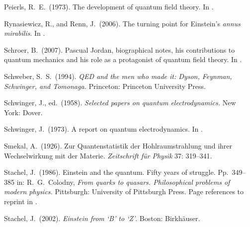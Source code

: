 \documentclass{elsart}
\begin{document}
{\begin{thebibliography}{}
 Peierls, R.\ E.\ (1973). The development of quantum field theory. In \citep[pp.\ 370--379]{Mehra 1973}.


 Rynasiewicz, R., and Renn, J.\ (2006). The turning point for Einstein's {\it annus mirabilis}. In \citep[5--35]{Janssen 2006}.

 Schroer, B.\ (2007). Pascual Jordan, biographical notes, his contributions to quantum mechanics and his role as a protagonist of quantum field theory. In \citep[pp.\ 47--68]{Hoffmann 2007}. 

 Schweber, S.\ S.\ (1994). {\it QED and the men who made it: Dyson, Feynman, Schwinger, and Tomonaga.} Princeton: Princeton University Press.

 Schwinger, J., ed.\ (1958). {\it Selected papers on quantum electrodynamics.} New York: Dover.

 Schwinger, J.\ (1973). A report on quantum electrodynamics. In \citep[pp.\ 412--413]{Mehra 1973}.

 Smekal, A.\ (1926). Zur Quantenstatistik der Hohlraumstrahlung und ihrer Wechselwirkung mit der Materie. {\it Zeitschrift f\"ur Physik} 37: 319--341. 

 Stachel,  J.\ (1986). Einstein and the quantum. Fifty years of struggle. Pp.\ 349--385 in: R.\ G.\ Colodny, {\it From quarks to quasars. Philosophical problems of modern physics.} Pittsburgh: University of Pittsburgh Press. Page references to reprint in \citep[pp.\ 367--402]{Stachel 2002}.

 Stachel,  J.\ (2002). {\it Einstein from `B' to `Z'}. Boston: Birkh\"{a}user.




\end{thebibliography}}
\end{document}
